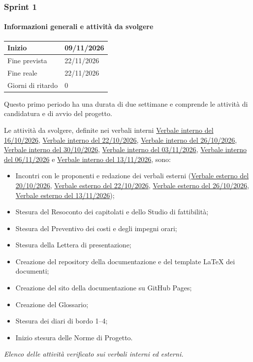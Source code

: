 \documentclass[a4paper, 11pt]{article}
\newcommand{\vint}[3]{\href{https://raw.githubusercontent.com/0x06tudio/docs/main/out/verbali/interni/vi_#1_#2_#3.pdf}{Verbale interno del #3/#2/#1}}
\newcommand{\vest}[3]{\href{https://raw.githubusercontent.com/0x06tudio/docs/main/out/verbali/esterni/ve_#1_#2_#3.pdf}{Verbale esterno del #3/#2/#1}}
\newcommand{\tbd}[1]{\colorbox{yellow!60}{#1}}
\begin{document}
\subsubsection{Sprint 1}

\paragraph{Informazioni generali e attività da svolgere}
\begin{table}[H]
\centering
\begin{tabular}{|l|l|}
    \hline
    Inizio & 09/11/2026 \\ \hline
    Fine prevista & 22/11/2026 \\ \hline
    Fine reale & 22/11/2026 \\ \hline
    Giorni di ritardo & \tbd{0} \\ \hline
\end{tabular}
\end{table}

Questo primo periodo ha una durata di due settimane e comprende le attività di candidatura e di avvio del progetto.

Le attività da svolgere, definite nei verbali interni
\vint{2026}{10}{16}, \vint{2026}{10}{22}, \vint{2026}{10}{26},
\vint{2026}{10}{30}, \vint{2026}{11}{03}, \vint{2026}{11}{06} e
\vint{2026}{11}{13}, sono:
\begin{itemize}[noitemsep]
    \item Incontri con le proponenti e redazione dei verbali esterni (\vest{2026}{10}{20}, \vest{2026}{10}{22}, \vest{2026}{10}{26}, \vest{2026}{11}{13});
    \item Stesura del Resoconto dei capitolati e dello Studio di fattibilità;
    \item Stesura del Preventivo dei costi e degli impegni orari;
    \item Stesura della Lettera di presentazione;
    \item Creazione del repository della documentazione e del template LaTeX dei documenti;
    \item Creazione del sito della documentazione su GitHub Pages;
    \item Creazione del Glossario;
    \item Stesura dei diari di bordo 1--4;
    \item Inizio stesura delle Norme di Progetto.
\end{itemize}
\textit{Elenco delle attività verificato sui verbali interni ed esterni.}
\end{document}
